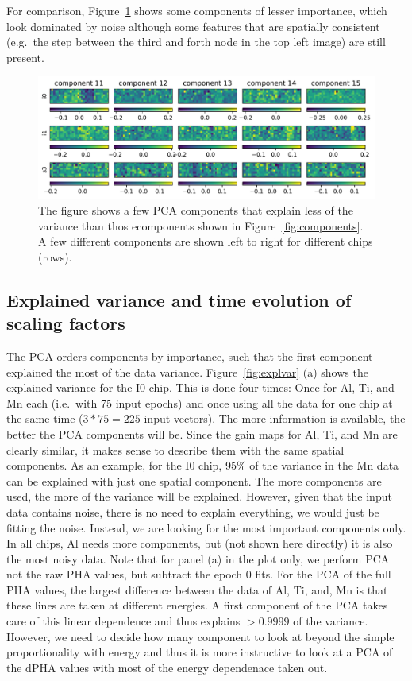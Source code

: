 \documentclass[]{spie}  %
\begin{document}
For comparison, Figure~\ref{fig:components_minor} shows some components of lesser importance, which look dominated by noise although some features that are spatially consistent (e.g.\ the step between the third and forth node in the top left image) are still present.

\begin{figure} [ht]
  \begin{center}
    \includegraphics[width=\textwidth]{figures/components_minor.pdf}
  \end{center}
  \caption
      {The figure shows a few PCA components that explain less of the variance than thos ecomponents shown in Figure~\ref{fig:components}. A few different components are shown left to right for different chips (rows). \label{fig:components_minor}}
\end{figure}

\subsection{Explained variance and time evolution of scaling factors}

The PCA orders components by importance, such that the first component explained the most of the data variance.  Figure~\ref{fig:explvar} (a) shows the explained variance for the I0 chip.
This is done four times: Once for Al, Ti, and Mn each (i.e.\ with 75 input epochs) and once using all the data for one chip at the same time ($3*75=225$ input vectors). The more information is available, the better the PCA components will be. Since the gain maps for Al, Ti, and Mn are clearly similar, it makes sense to describe them with the same spatial components. As an example, for the I0 chip, 95\% of the variance in the Mn data can be explained with just one spatial component. The more components are used, the more of the variance will be explained. However, given that the input data contains noise, there is no need to explain everything, we would just be fitting the noise. Instead, we are looking for the most important components only. In all chips, Al needs more components, but (not shown here directly) it is also the most noisy data. Note that for panel (a) in the plot only, we perform PCA not the raw PHA values, but subtract the epoch 0 fits. For the PCA of the full PHA values, the largest difference between the data of Al, Ti, and, Mn is that these lines are taken at different energies. A first component of the PCA takes care of this linear dependence and thus explains $>0.9999$ of the variance. However, we need to decide how many component to look at beyond the simple proportionality with energy and thus it is more instructive to look at a PCA of the dPHA values with most of the energy dependenace taken out.
\end{document}
